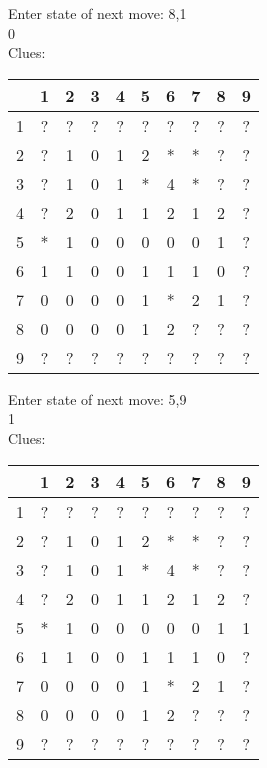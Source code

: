 Enter state of next move: 8,1\\
0\\
Clues:\\
\begin{tabular}{|c|c|c|c|c|c|c|c|c|c|}
\hline
  & 1 & 2 & 3 & 4 & 5 & 6 & 7 & 8 & 9\\
\hline
1 & ? & ? & ? & ? & ? & ? & ? & ? & ?\\
\hline
2 & ? & 1 & 0 & 1 & 2 & * & * & ? & ?\\
\hline
3 & ? & 1 & 0 & 1 & * & 4 & * & ? & ?\\
\hline
4 & ? & 2 & 0 & 1 & 1 & 2 & 1 & 2 & ?\\
\hline
5 & * & 1 & 0 & 0 & 0 & 0 & 0 & 1 & ?\\
\hline
6 & 1 & 1 & 0 & 0 & 1 & 1 & 1 & 0 & ?\\
\hline
7 & 0 & 0 & 0 & 0 & 1 & * & 2 & 1 & ?\\
\hline
8 & 0 & 0 & 0 & 0 & 1 & 2 & ? & ? & ?\\
\hline
9 & ? & ? & ? & ? & ? & ? & ? & ? & ?\\
\hline
\end{tabular}

Enter state of next move: 5,9\\
1\\
Clues:\\
\begin{tabular}{|c|c|c|c|c|c|c|c|c|c|}
\hline
  & 1 & 2 & 3 & 4 & 5 & 6 & 7 & 8 & 9\\
\hline
1 & ? & ? & ? & ? & ? & ? & ? & ? & ?\\
\hline
2 & ? & 1 & 0 & 1 & 2 & * & * & ? & ?\\
\hline
3 & ? & 1 & 0 & 1 & * & 4 & * & ? & ?\\
\hline
4 & ? & 2 & 0 & 1 & 1 & 2 & 1 & 2 & ?\\
\hline
5 & * & 1 & 0 & 0 & 0 & 0 & 0 & 1 & 1\\
\hline
6 & 1 & 1 & 0 & 0 & 1 & 1 & 1 & 0 & ?\\
\hline
7 & 0 & 0 & 0 & 0 & 1 & * & 2 & 1 & ?\\
\hline
8 & 0 & 0 & 0 & 0 & 1 & 2 & ? & ? & ?\\
\hline
9 & ? & ? & ? & ? & ? & ? & ? & ? & ?\\
\hline
\end{tabular}

